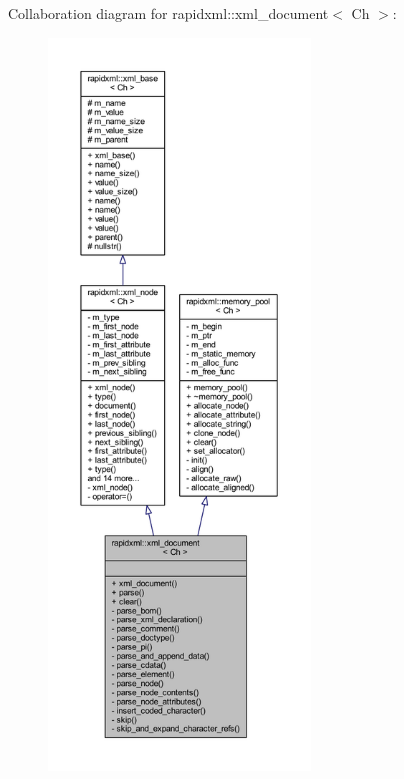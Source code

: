 Collaboration diagram for rapidxml\+:\+:xml\+\_\+document$<$ Ch $>$\+:\nopagebreak
\begin{figure}[H]
\begin{center}
\leavevmode
\includegraphics[height=550pt]{singletonrapidxml_1_1xml__document__coll__graph}
\end{center}
\end{figure}
